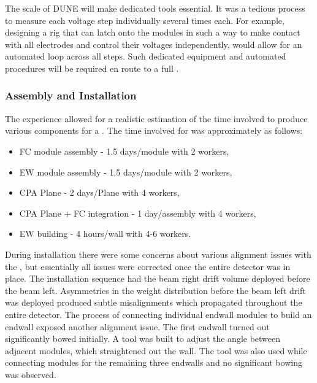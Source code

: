 The scale of DUNE will make dedicated  tools essential.
It was a tedious process to measure each voltage step individually several times each.
For example, designing a rig that can latch onto the  modules in such a way to make contact with all electrodes and control their voltages independently, would allow for an automated loop across all steps.
Such dedicated equipment and automated procedures will be required en route to a full .

\subsubsection{Assembly and Installation}
\label{sec:fdsp-hv-protodune-lessons-assy}
The  experience allowed for a realistic estimation of the time involved to produce various  components for a .
The time involved for  was approximately as follows:
\begin{itemize}
\item FC module assembly - 1.5 days/module with 2 workers,
\item EW module assembly - 1.5 days/module with 2 workers,
\item CPA Plane - 2 days/Plane with 4 workers,
\item CPA Plane + FC integration - 1 day/assembly with 4 workers,
\item EW building - 4 hours/wall with 4-6 workers.
\end{itemize}
During installation there were some concerns about various alignment issues with the , but essentially all issues were corrected once the entire detector was in place.
The  installation sequence had the beam right drift volume deployed before the beam left.
Asymmetries in the weight distribution before the beam left drift was deployed produced subtle misalignments which propagated throughout the entire detector.
The process of connecting individual endwall modules to build an endwall exposed another alignment issue.
The first endwall turned out significantly bowed initially.
A tool was built to adjust the angle between adjacent modules, which straightened out the wall.
The tool was also used while connecting modules for the remaining three endwalls and no significant bowing was observed.

